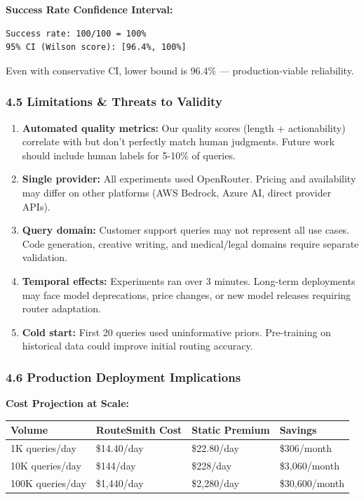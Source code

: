 \documentclass[
  11pt,
]{article}
\begin{document}
\textbf{Success Rate Confidence Interval:}

\begin{verbatim}
Success rate: 100/100 = 100%
95% CI (Wilson score): [96.4%, 100%]
\end{verbatim}

Even with conservative CI, lower bound is 96.4\% --- production-viable
reliability.

\hypertarget{limitations-threats-to-validity}{%
\subsubsection{4.5 Limitations \& Threats to
Validity}\label{limitations-threats-to-validity}}

\begin{enumerate}
\def\labelenumi{\arabic{enumi}.}
\item
  \textbf{Automated quality metrics:} Our quality scores (length +
  actionability) correlate with but don't perfectly match human
  judgments. Future work should include human labels for 5-10\% of
  queries.
\item
  \textbf{Single provider:} All experiments used OpenRouter. Pricing and
  availability may differ on other platforms (AWS Bedrock, Azure AI,
  direct provider APIs).
\item
  \textbf{Query domain:} Customer support queries may not represent all
  use cases. Code generation, creative writing, and medical/legal
  domains require separate validation.
\item
  \textbf{Temporal effects:} Experiments ran over 3 minutes. Long-term
  deployments may face model deprecations, price changes, or new model
  releases requiring router adaptation.
\item
  \textbf{Cold start:} First 20 queries used uninformative priors.
  Pre-training on historical data could improve initial routing
  accuracy.
\end{enumerate}

\hypertarget{production-deployment-implications}{%
\subsubsection{4.6 Production Deployment
Implications}\label{production-deployment-implications}}

\textbf{Cost Projection at Scale:}

\begin{longtable}[]{@{}llll@{}}
\toprule
Volume & RouteSmith Cost & Static Premium & Savings \\
\midrule
\endhead
1K queries/day & \$14.40/day & \$22.80/day & \$306/month \\
10K queries/day & \$144/day & \$228/day & \$3,060/month \\
100K queries/day & \$1,440/day & \$2,280/day & \$30,600/month \\
\bottomrule
\end{longtable}
\end{document}
